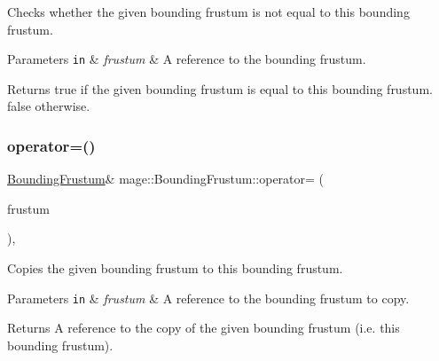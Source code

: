 Checks whether the given bounding frustum is not equal to this bounding frustum.


\begin{DoxyParams}[1]{Parameters}
\mbox{\tt in}  & {\em frustum} & A reference to the bounding frustum. \\
\hline
\end{DoxyParams}
\begin{DoxyReturn}{Returns}
{\ttfamily true} if the given bounding frustum is equal to this bounding frustum. {\ttfamily false} otherwise. 
\end{DoxyReturn}
\mbox{\label{classmage_1_1_bounding_frustum_a713509c0c2e9e947bc448e2743903c12}} 
\subsubsection{\texorpdfstring{operator=()}{operator=()}\hspace{0.1cm}{\footnotesize\ttfamily [1/2]}}
{\footnotesize\ttfamily \mbox{\hyperlink{classmage_1_1_bounding_frustum}{Bounding\+Frustum}}\& mage\+::\+Bounding\+Frustum\+::operator= (\begin{DoxyParamCaption}\item[{const \mbox{\hyperlink{classmage_1_1_bounding_frustum}{Bounding\+Frustum}} \&}]{frustum }\end{DoxyParamCaption})\hspace{0.3cm}{\ttfamily [default]}, {\ttfamily [noexcept]}}

Copies the given bounding frustum to this bounding frustum.


\begin{DoxyParams}[1]{Parameters}
\mbox{\tt in}  & {\em frustum} & A reference to the bounding frustum to copy. \\
\hline
\end{DoxyParams}
\begin{DoxyReturn}{Returns}
A reference to the copy of the given bounding frustum (i.\+e. this bounding frustum). 
\end{DoxyReturn}
\mbox{\label{classmage_1_1_bounding_frustum_ae6a344dc47b0a8dffd49fc4a95c364a5}} 
